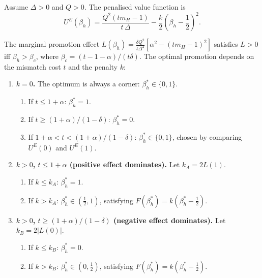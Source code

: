 \documentclass[mnsc,nonblindrev]{informs3_NoOR}
\begin{document}
\begin{proposition}\label{prop:beta-eng}
Assume $\Delta > 0$ and $Q > 0$. The penalised value function is
\begin{equation}
    U^E(\beta_h) = \frac{Q^2(tm_H - 1)}{t\,\Delta} - \frac{k}{2}\!\left(\beta_h - \frac{1}{2}\right)^{\!2}. \label{eq:VE}
\end{equation}


The marginal promotion effect $L(\beta_h) = \frac{\delta Q^2}{t\Delta^2}[\alpha^2 - (tm_H-1)^2]$ satisfies $L > 0$ iff $\beta_h > \beta_c$, where $\beta_c = (t-1-\alpha)/(t\delta)$. The optimal promotion depends on the mismatch cost $t$ and the penalty $k$:
 
\begin{enumerate}
\item[\textup{(i)}] \textbf{$k = 0$.} The optimum is always a corner: $\beta_h^* \in \{0,1\}$.
\begin{enumerate}[label=(\alph*)]
\item If $t \leq 1+\alpha$: $\beta_h^* = 1$.
\item If $t \geq (1+\alpha)/(1-\delta)$: $\beta_h^* = 0$.
\item If $1+\alpha < t < (1+\alpha)/(1-\delta)$: $\beta_h^* \in \{0,1\}$, chosen by comparing $U^E(0)$ and $U^E(1)$.
\end{enumerate}
 
\item[\textup{(ii)}] \textbf{$k > 0$, $t \leq 1+\alpha$ (positive effect dominates).} Let $k_A = 2L(1)$.
\begin{enumerate}[label=(\alph*)]
\item If $k \leq k_A$: $\beta_h^* = 1$.
\item If $k > k_A$: $\beta_h^* \in (\frac{1}{2}, 1)$, satisfying $F(\beta_h^*) = k(\beta_h^* - \frac{1}{2})$.
\end{enumerate}
 
\item[\textup{(iii)}] \textbf{$k > 0$, $t \geq (1+\alpha)/(1-\delta)$ (negative effect dominates).} Let $k_B = 2|L(0)|$.
\begin{enumerate}[label=(\alph*)]
\item If $k \leq k_B$: $\beta_h^* = 0$.
\item If $k > k_B$: $\beta_h^* \in (0, \frac{1}{2})$, satisfying $F(\beta_h^*) = k(\beta_h^* - \frac{1}{2})$.
\end{enumerate}
 

\end{enumerate}
\end{proposition}
\end{document}
